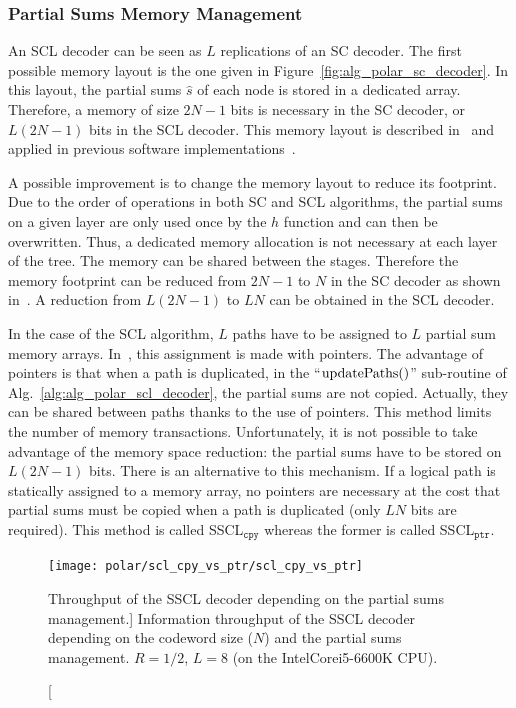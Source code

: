 \subsubsection{Partial Sums Memory Management}

An SCL decoder can be seen as $L$ replications of an SC decoder. The first
possible memory layout is the one given in
Figure~\ref{fig:alg_polar_sc_decoder}. In this layout, the partial sums
$\hat{s}$ of each node is stored in a dedicated array. Therefore, a memory of
size $2N-1$ bits is necessary in the SC decoder, or $L(2N -1)$ bits in the SCL
decoder. This memory layout is described in~\cite{Tal2011} and applied in
previous software implementations~\cite{Sarkis2014b,Sarkis2016,Shen2016}.

A possible improvement is to change the memory layout to reduce its footprint.
Due to the order of operations in both SC and SCL algorithms, the partial sums
on a given layer are only used once by the $h$ function and can then be
overwritten. Thus, a dedicated memory allocation is not necessary at each layer
of the tree. The memory can be shared between the stages. Therefore the memory
footprint can be reduced from $2N-1$ to $N$ in the SC decoder as shown
in~\cite{Leroux2013}. A reduction from $L(2N -1)$ to $LN$ can be obtained in the
SCL decoder.

In the case of the SCL algorithm, $L$ paths have to be assigned to $L$ partial
sum memory arrays. In~\cite{Tal2011}, this assignment is made with pointers. The
advantage of pointers is that when a path is duplicated, in the
``$\operatorname*{updatePaths}()$'' sub-routine of Alg.~\ref{alg:alg_polar_scl_decoder}, the
partial sums are not copied. Actually, they can be shared between paths thanks
to the use of pointers. This method limits the number of memory transactions.
Unfortunately, it is not possible to take advantage of the memory space
reduction: the partial sums have to be stored on $L(2N -1)$ bits. There is an
alternative to this mechanism. If a logical path is statically assigned to a
memory array, no pointers are necessary at the cost that partial sums must be
copied when a path is duplicated (only $LN$ bits are required). This method is
called SSCL$_{\texttt{cpy}}$ whereas the former is called SSCL$_{\texttt{ptr}}$.

\begin{figure}[htp]
  \centering
  \texttt{[image: polar/scl\_cpy\_vs\_ptr/scl\_cpy\_vs\_ptr]}
  \caption
    [Throughput of the SSCL decoder depending on the partial sums management.]
    {Information throughput of the SSCL decoder depending on the codeword
    size ($N$) and the partial sums management. $R = 1 / 2$, $L = 8$ (on the
    Intel\R Core\TM i5-6600K CPU).}
  \label{plot:opt_polar_scl_cpy_vs_ptr}
\end{figure}

